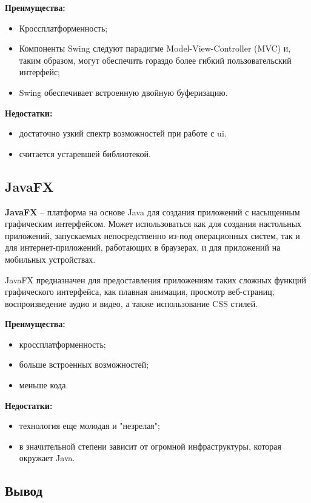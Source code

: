 \textbf{Преимущества:} 
\begin{itemize}
    \item Кроссплатформенность;
    \item Компоненты Swing следуют парадигме Model-View-Controller (MVC) и, таким образом, могут обеспечить гораздо более гибкий пользовательский интерфейс;
    \item Swing обеспечивает встроенную двойную буферизацию.
\end{itemize}

\textbf{Недостатки:} 
\begin{itemize}
	\item достаточно узкий спектр возможностей при работе с ui.
    \item считается устаревшей библиотекой.
\end{itemize}


\subsection{JavaFX}

\textbf{JavaFX} -- платформа на основе Java для создания приложений с насыщенным графическим интерфейсом. Может использоваться как для создания настольных приложений, запускаемых непосредственно из-под операционных систем, так и для интернет-приложений, работающих в браузерах, и для приложений на мобильных устройствах. 

JavaFX предназначен для предоставления приложениям таких сложных функций графического интерфейса, как плавная анимация, просмотр веб-страниц, воспроизведение аудио и видео, а также использование CSS стилей.

\textbf{Преимущества:} 
\begin{itemize}
	\item кроссплатформенность;
    \item больше встроенных возможностей;
    \item меньше кода.
\end{itemize}

\textbf{Недостатки:} 
\begin{itemize}
    \item технология еще молодая и "незрелая";
    \item в значительной степени зависит от огромной инфраструктуры, которая окружает Java.
\end{itemize}



\subsection*{Вывод}

